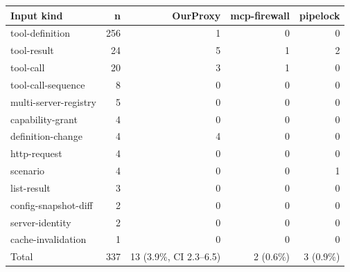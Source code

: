 \begin{tabular}{@{}lrrrr@{}}
\toprule
Input kind & n & OurProxy & mcp-firewall & pipelock \\
\midrule
tool-definition & 256 & 1 & 0 & 0 \\
tool-result & 24 & 5 & 1 & 2 \\
tool-call & 20 & 3 & 1 & 0 \\
tool-call-sequence & 8 & 0 & 0 & 0 \\
multi-server-registry & 5 & 0 & 0 & 0 \\
capability-grant & 4 & 0 & 0 & 0 \\
definition-change & 4 & 4 & 0 & 0 \\
http-request & 4 & 0 & 0 & 0 \\
scenario & 4 & 0 & 0 & 1 \\
list-result & 3 & 0 & 0 & 0 \\
config-snapshot-diff & 2 & 0 & 0 & 0 \\
server-identity & 2 & 0 & 0 & 0 \\
cache-invalidation & 1 & 0 & 0 & 0 \\
\midrule
Total & 337 & 13 (3.9\%, CI 2.3--6.5) & 2 (0.6\%) & 3 (0.9\%) \\
\bottomrule
\end{tabular}
